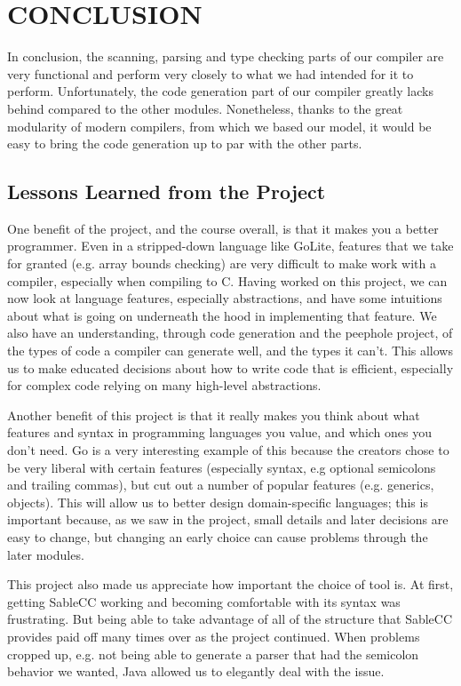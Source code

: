 \documentclass[11pt]{article}
\begin{document}
\section{CONCLUSION}

In conclusion, the scanning, parsing and type checking parts of our compiler are very functional and perform very closely to what we had intended for it to perform. Unfortunately, the code generation part of our compiler greatly lacks behind compared to the other modules. Nonetheless, thanks to the great modularity of modern compilers, from which we based our model, it would be easy to bring the code generation up to par with the other parts.

\subsection{Lessons Learned from the Project}

One benefit of the project, and the course overall, is that it makes you a better programmer. Even in a stripped-down language like GoLite, features that we take for granted (e.g. array bounds checking) are very difficult to make work with a compiler, especially when compiling to C. Having worked on this project, we can now look at language features, especially abstractions, and have some intuitions about what is going on underneath the hood in implementing that feature. We also have an understanding, through code generation and the peephole project, of the types of code a compiler can generate well, and the types it can't. This allows us to make educated decisions about how to write code that is efficient, especially for complex code relying on many high-level abstractions.

Another benefit of this project is that it really makes you think about what features and syntax in programming languages you value, and which ones you don't need. Go is a very interesting example of this because the creators chose to be very liberal with certain features (especially syntax, e.g optional semicolons and trailing commas), but cut out a number of popular features (e.g. generics, objects). This will allow us to better design domain-specific languages; this is important because, as we saw in the project, small details and later decisions are easy to change, but changing an early choice can cause problems through the later modules. 

This project also made us appreciate how important the choice of tool is. At first, getting SableCC working and becoming comfortable with its syntax was frustrating. But being able to take advantage of all of the structure that SableCC provides paid off many times over as the project continued. When problems cropped up, e.g. not being able to generate a parser that had the semicolon behavior we wanted, Java allowed us to elegantly deal with the issue. 
\end{document}
